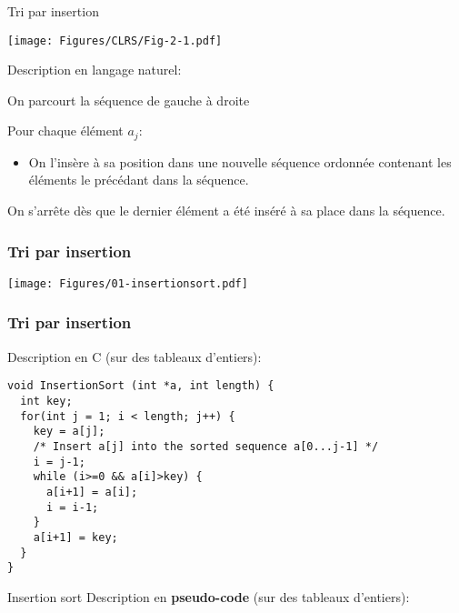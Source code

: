 \begin{frame}{Tri par insertion}

\hfill\texttt{[image: Figures/CLRS/Fig-2-1.pdf]}

Description en langage naturel:


\bigskip

On parcourt la séquence de gauche à droite

\bigskip

Pour chaque élément $a_j$:
\begin{itemize}
\item On l'{\alert{insère}} à sa position dans une nouvelle séquence ordonnée contenant les éléments le précédant dans la séquence.
\end{itemize}
On s'arrête dès que le dernier élément a été inséré à sa place dans la séquence.

\end{frame}

\begin{frame}
\frametitle{Tri par insertion}
\centerline{\texttt{[image: Figures/01-insertionsort.pdf]}}
\end{frame}

\begin{frame}[fragile]
\frametitle{Tri par insertion}

Description en C (sur des tableaux d'entiers):

{\small
\begin{verbatim}
void InsertionSort (int *a, int length) {
  int key;
  for(int j = 1; i < length; j++) {
    key = a[j];
    /* Insert a[j] into the sorted sequence a[0...j-1] */
    i = j-1;
    while (i>=0 && a[i]>key) {
      a[i+1] = a[i];
      i = i-1;
    }
    a[i+1] = key;
  }
}
\end{verbatim}
}

\end{frame}

\begin{frame}{Insertion sort}
Description en {\bf pseudo-code} (sur des tableaux d'entiers):

\bigskip


\end{frame}

